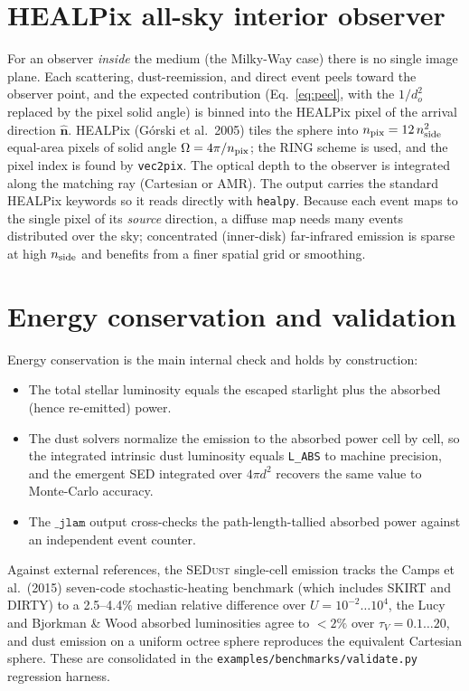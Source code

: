 \documentclass[english,a4paper]{kiseon_memo}
\newcommand{\nhat}{\hat{\mathbf n}}
\newcommand{\code}[1]{\texttt{#1}}
\newcommand{\file}[1]{\texttt{#1}}
\begin{document}
\section{HEALPix all-sky interior observer}\label{sec:allsky}

For an observer \emph{inside} the medium (the Milky-Way case) there is no single
image plane.  Each scattering, dust-reemission, and direct event peels toward the
observer point, and the expected contribution (Eq.~\ref{eq:peel}, with the
$1/d_o^2$ replaced by the pixel solid angle) is binned into the HEALPix pixel of
the arrival direction $\nhat$.  HEALPix (G\'orski et al.~2005) tiles the sphere
into $n_{\rm pix}=12\,n_{\rm side}^2$ equal-area pixels of solid angle
$\Omega=4\pi/n_{\rm pix}$; the RING scheme is used, and the pixel index is found
by \code{vec2pix}.  The optical depth to the observer is integrated along the
matching ray (Cartesian or AMR).  The output carries the standard HEALPix
keywords so it reads directly with \code{healpy}.  Because each event maps to the
single pixel of its \emph{source} direction, a diffuse map needs many events
distributed over the sky; concentrated (inner-disk) far-infrared emission is
sparse at high $n_{\rm side}$ and benefits from a finer spatial grid or
smoothing.

\section{Energy conservation and validation}

Energy conservation is the main internal check and holds by construction:
\begin{itemize}
\item The total stellar luminosity equals the escaped starlight plus the
      absorbed (hence re-emitted) power.
\item The dust solvers normalize the emission to the absorbed power cell by
      cell, so the integrated intrinsic dust luminosity equals \code{L\_ABS} to
      machine precision, and the emergent SED integrated over $4\pi d^2$ recovers
      the same value to Monte-Carlo accuracy.
\item The $\code{\_jlam}$ output cross-checks the path-length-tallied absorbed
      power against an independent event counter.
\end{itemize}
Against external references, the \textsc{SEDust} single-cell emission tracks the
Camps et al.~(2015) seven-code stochastic-heating benchmark (which includes
\textsc{SKIRT} and \textsc{DIRTY}) to a 2.5--4.4\% median relative difference over
$U=10^{-2}\ldots10^{4}$, the Lucy and Bjorkman \& Wood absorbed luminosities
agree to $<2\%$ over $\tau_V=0.1\ldots20$, and dust emission on a uniform octree
sphere reproduces the equivalent Cartesian sphere.  These are consolidated in the
\file{examples/benchmarks/validate.py} regression harness.
\end{document}
